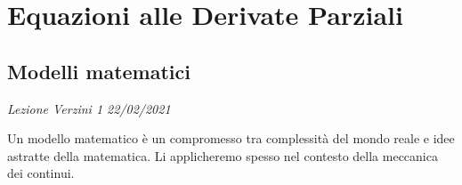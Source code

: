 \documentclass[10pt,a4paper,twoside,openright]{book}
\begin{document}
\part{Equazioni alle Derivate Parziali}
\chapter{Modelli matematici}

\textit{Lezione Verzini 1 22/02/2021}

Un modello matematico è un compromesso tra complessità del mondo reale e idee astratte della matematica. Li applicheremo spesso nel contesto della meccanica dei continui.
\end{document}
